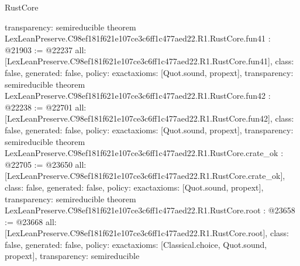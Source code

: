 \begin{lexlean}{RustCore}
\begin{coremodule}
{  transparency: semireducible
}
theorem LexLeanPreserve.C98ef181f621e107ce3c6ff1c477aed22.R1.RustCore.fun41 : @21903 := @22237 {
  all: [LexLeanPreserve.C98ef181f621e107ce3c6ff1c477aed22.R1.RustCore.fun41],
  class: false,
  generated: false,
  policy: exact{axioms: [Quot.sound, propext]},
  transparency: semireducible
}
theorem LexLeanPreserve.C98ef181f621e107ce3c6ff1c477aed22.R1.RustCore.fun42 : @22238 := @22701 {
  all: [LexLeanPreserve.C98ef181f621e107ce3c6ff1c477aed22.R1.RustCore.fun42],
  class: false,
  generated: false,
  policy: exact{axioms: [Quot.sound, propext]},
  transparency: semireducible
}
theorem LexLeanPreserve.C98ef181f621e107ce3c6ff1c477aed22.R1.RustCore.crate_ok : @22705 := @23650 {
  all: [LexLeanPreserve.C98ef181f621e107ce3c6ff1c477aed22.R1.RustCore.crate_ok],
  class: false,
  generated: false,
  policy: exact{axioms: [Quot.sound, propext]},
  transparency: semireducible
}
theorem LexLeanPreserve.C98ef181f621e107ce3c6ff1c477aed22.R1.RustCore.root : @23658 := @23668 {
  all: [LexLeanPreserve.C98ef181f621e107ce3c6ff1c477aed22.R1.RustCore.root],
  class: false,
  generated: false,
  policy: exact{axioms: [Classical.choice, Quot.sound, propext]},
  transparency: semireducible
}


\end{coremodule}
\end{lexlean}
